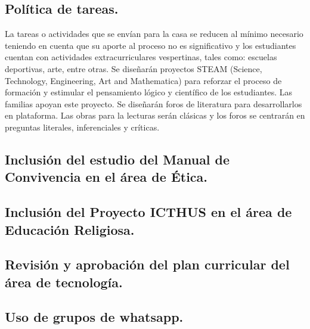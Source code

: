 \documentclass[12pt, letterpaper]{article} %
\begin{document}
\subsection{Política de tareas.} La tareas o actividades que se envían para la casa se reducen al mínimo necesario teniendo en cuenta que su aporte al proceso no es significativo y los estudiantes cuentan con actividades extracurriculares vespertinas, tales como: escuelas deportivas, arte, entre otras.
Se diseñarán proyectos STEAM (Science, Technology, Engineering, Art and Mathematica) para reforzar el proceso de formación y estimular el pensamiento lógico y científico de los estudiantes. Las familias apoyan este proyecto.
Se diseñarán foros de literatura para desarrollarlos en plataforma. Las obras para la lecturas serán clásicas y los foros se centrarán en preguntas literales, inferenciales y críticas.

\subsection{Inclusión del estudio del Manual de Convivencia en el área de Ética.} 
\subsection{Inclusión del Proyecto ICTHUS en el área de Educación Religiosa.} 
\subsection{Revisión y aprobación del plan curricular del área de tecnología.} 
\subsection{Uso de grupos de whatsapp.} 


\end{document}
